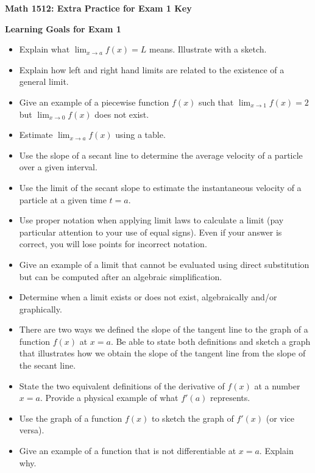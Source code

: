\documentclass[11pt]{article}
\begin{document}

\centerline{\textbf{\Large{Math 1512: Extra Practice for Exam 1 Key}}}

\vspace{0.2in}

\textbf{\Large{Learning Goals for Exam 1}}

\begin{itemize}
\item Explain what $\lim_{x\rightarrow a}f(x)=L$ means. Illustrate with a sketch. 
\item Explain how left and right hand limits are related to the existence of a general limit.
\item Give an example of a piecewise function $f(x)$ such that $\lim_{x\rightarrow 1}f(x)=2$ but $\lim_{x\rightarrow 0}f(x)$ does not exist.
\item Estimate $\lim_{x\rightarrow a}f(x)$ using a table. 
\item Use the slope of a secant line to determine the average velocity of a particle over a given interval.
\item Use the limit of the secant slope to estimate the instantaneous velocity of a particle at a given time $t=a$.




\item Use proper notation when applying limit laws to calculate a limit (pay particular attention to your use of equal signs). Even if your answer is correct, you will lose points for incorrect notation. 
\item Give an example of a limit that cannot be evaluated using direct substitution but can be computed after an algebraic simplification. 
\item Determine when a limit exists or does not exist, algebraically and/or graphically.
\item There are two ways we defined the slope of the tangent line to the graph of a function $f(x)$ at $x=a$. Be able to state both definitions and sketch a graph that illustrates how we obtain the slope of the tangent line from the slope of the secant line.
\item State the two equivalent definitions of the derivative of $f(x)$ at a number $x=a$. Provide a physical example of what $f'(a)$ represents.
\item Use the graph of a function $f(x)$ to sketch the graph of $f'(x)$ (or vice versa).
\item Give an example of a function that is not differentiable at $x=a$. Explain why.




\end{itemize}
\end{document}
